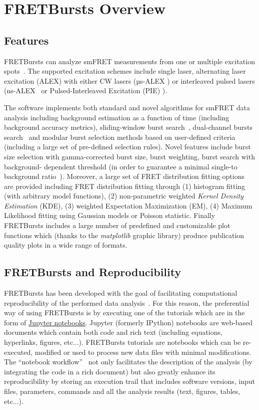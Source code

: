 \section{FRETBursts Overview}
\label{sec:overview}

\subsection{Features}


FRETBursts can analyze smFRET measurements
from one or multiple excitation spots~\cite{Ingargiola_2013}. The supported
excitation schemes include single laser, alternating laser excitation (ALEX)
with either CW lasers (µs-ALEX \cite{Kapanidis_2005})
or interleaved pulsed lasers (ns-ALEX~\cite{Laurence_2005} or
Pulsed-Interleaved Excitation (PIE) \cite{M_ller_2005}).

The software implements both standard and novel algorithms for smFRET data analysis
including background estimation as a function of time (including background accuracy
metrics), sliding-window burst search~\cite{Eggeling_1998}, 
dual-channel bursts search~\cite{Nir_2006} and
modular burst selection methods based on user-defined criteria
(including a large set of pre-defined selection rules). Novel features include burst size
selection with gamma-corrected burst size, burst weighting, burst search with background-
dependent threshold (in order to guarantee a minimal single-to background 
ratio~\cite{Michalet_2012}).
Moreover, a large set of FRET distribution fitting options are provided including
FRET distribution fitting through (1) histogram fitting (with arbitrary model functions),
(2)  non-parametric weighted \textit{Kernel Density Estimation} (KDE), (3) weighted
Expectation Maximization (EM), (4) Maximum Likelihood fitting using Gaussian models
or Poisson statistic. Finally FRETBursts includes a large number of
predefined and customizable plot functions which (thanks to the \textit{matplotlib}
graphic library) produce publication quality plots in a wide range of formats.


\subsection{FRETBursts and Reproducibility}
FRETBursts has been developed with the goal of facilitating computational reproducibility
of the performed data analysis~\cite{Buckheit_1995}. For this reason,
the preferential way of using FRETBursts is by executing one of the tutorials
which are in the form of \href{http://ipython.org/notebook.html}{Jupyter notebooks}.
Jupyter (formerly IPython) notebooks are web-based documents which contain both
code and rich text (including equations, hyperlinks, figures, etc...).
FRETBursts tutorials are notebooks which can be re-executed,
modified or used to process new data files with minimal modifications.
The ``notebook workflow''~\cite{Shen_2014} not only facilitates
the description of the analysis (by integrating the code in a rich document)
but also greatly enhance its reproducibility by storing an execution trail
that includes software versions, input files, parameters, commands and all
the analysis results (text, figures, tables, etc...).

